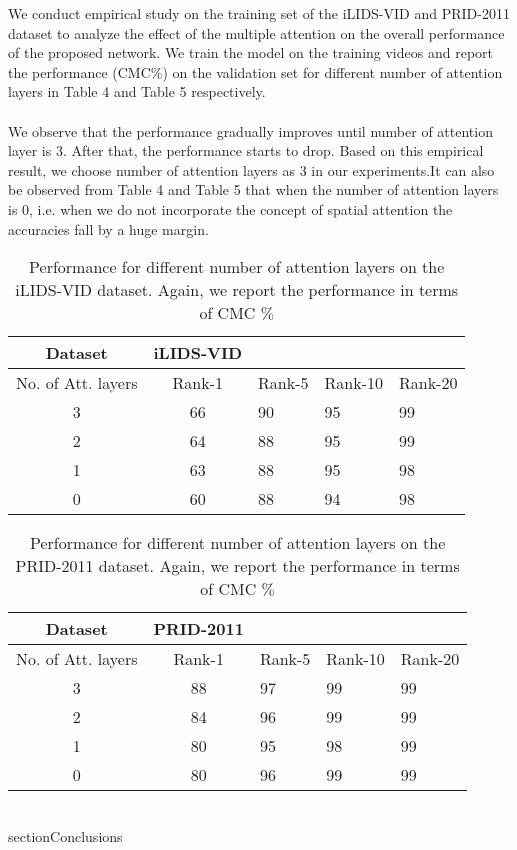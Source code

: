 \documentclass[sigconf, authordraft,review=false]{acmart}
\begin{document}
We  conduct  empirical  study  on  the  training  set  of  the
iLIDS-VID and PRID-2011 dataset to analyze the effect of the
multiple attention on the overall performance of the proposed network. We train the model on the
training videos and report the performance (CMC\(\%\)) on
the validation set for different number of attention layers in Table 4 and Table 5 respectively.  \\~\\
We observe that the performance gradually improves until number of attention layer is 3.  After that, the performance starts to drop.  Based on this empirical result, we choose number of attention layers as 3 in our experiments.It can also be observed from Table 4 and Table 5 that when the number of attention layers is 0, i.e. when we do not incorporate the concept of spatial attention the accuracies fall by a huge margin.
\begin{table}[h]
  \caption{ Performance for different number of attention layers
on the iLIDS-VID dataset.  Again, we report the performance in
terms of CMC \(\%\)}
  \label{tab:freq}
  \begin{tabular}{cclll}
    \toprule
    Dataset&iLIDS-VID\\
    \midrule
    No. of Att. layers & Rank-1& Rank-5& Rank-10& Rank-20\\
   3& 66& 90& 95& 99\\
    2 & 64& 88& 95& 99\\
   1 &63 & 88&95 &98 \\
	 0 &60 & 88&94 &98 \\
    
  \bottomrule
\end{tabular}
\end{table}\begin{table}[h]
  \caption{ Performance for different number of attention layers
on the PRID-2011 dataset.  Again, we report the performance in
terms of CMC \(\%\)}
  \label{tab:freq}
  \begin{tabular}{cclll}
    \toprule
    Dataset&PRID-2011\\
    \midrule
    No. of Att. layers & Rank-1& Rank-5& Rank-10& Rank-20\\
   3& 88& 97& 99& 99\\
    2 & 84& 96& 99&99 \\
   1 & 80& 95& 98& 99 \\
    	 0 &80 & 96&99 &99 \\

    
  \bottomrule
\end{tabular}
\end{table}\\section{Conclusions}
\end{document}
